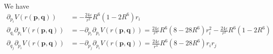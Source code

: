 \documentclass{scrartcl}
\newcommand{\boldp}{\boldsymbol{p}}
\newcommand{\boldq}{\boldsymbol{q}}
\begin{document}
We have 
\begin{align}
  \partial_{p_i} V(r(\boldp, \boldq)) &= - \frac{24 \varepsilon}{r^2} R^6 \left(1 - 2 R^6\right)r_i \\
  \partial_{q_i}\partial_{p_i} V(r(\boldp, \boldq)) &= - \partial_{p_i}\partial_{p_i} V(r(\boldp, \boldq)) = \frac{24 \varepsilon}{r^4} R^6 \left(8 - 28 R^6\right)r_i^2 - \frac{24 \varepsilon}{r^2} R^6 \left(1 - 2 R^6\right) \\ 
  \partial_{q_j}\partial_{p_i} V(r(\boldp, \boldq)) &= - \partial_{p_j}\partial_{p_i} V(r(\boldp, \boldq)) = \frac{24 \varepsilon}{r^4} R^6 \left(8 - 28 R^6\right)r_ir_j
\end{align}
\end{document}
